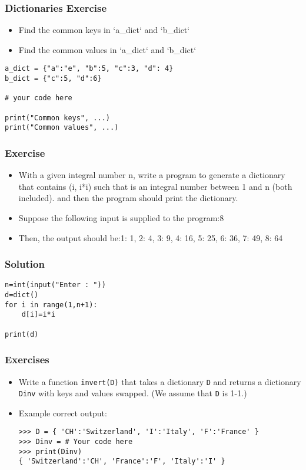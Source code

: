 \begin{frame}[fragile]\frametitle{Dictionaries Exercise}
  \begin{itemize}
  \item Find the common keys in `a\_dict` and `b\_dict`
  \item Find the common values in `a\_dict` and `b\_dict`
  \end{itemize}
\begin{lstlisting}
a_dict = {"a":"e", "b":5, "c":3, "d": 4}
b_dict = {"c":5, "d":6}

# your code here

print("Common keys", ...)
print("Common values", ...)
\end{lstlisting}
\end{frame}

\begin{frame}[fragile]\frametitle{Exercise}
\begin{itemize}
\item With a given integral number n, write a program to generate a dictionary that contains (i, i*i) such that is an integral number between 1 and n (both included). and then the program should print the dictionary.
\item Suppose the following input is supplied to the program:8
\item Then, the output should be:{1: 1, 2: 4, 3: 9, 4: 16, 5: 25, 6: 36, 7: 49, 8: 64}
\end{itemize}
\end{frame}

\begin{frame}[fragile]\frametitle{Solution}
\begin{lstlisting}
n=int(input("Enter : "))
d=dict()
for i in range(1,n+1):
    d[i]=i*i

print(d)
\end{lstlisting}
\end{frame}


\begin{frame}[fragile]\frametitle{Exercises}
\begin{itemize}
\item Write a function \texttt{invert(D)} that takes a dictionary \texttt{D} and returns a dictionary \texttt{Dinv} with keys and values swapped. (We assume that \texttt{D} is 1-1.)
\item Example correct output:
\begin{lstlisting}
>>> D = { 'CH':'Switzerland', 'I':'Italy', 'F':'France' }
>>> Dinv = # Your code here
>>> print(Dinv)
{ 'Switzerland':'CH', 'France':'F', 'Italy':'I' }
\end{lstlisting}
\end{itemize}
\end{frame}

